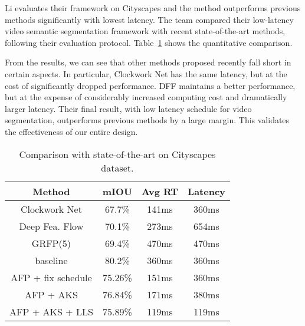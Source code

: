 \documentclass[10pt,twocolumn,letterpaper]{article}
\begin{document}
Li evaluates their framework on Cityscapes \cite{cordts2016cityscapes} and the method outperforms previous methods significantly with lowest latency. The team compared their low-latency video semantic segmentation framework with recent state-of-the-art methods, following their evaluation protocol. Table~\ref{Com} shows the quantitative comparison. 

From the results, we can see that other methods proposed recently fall short in certain aspects. In particular, Clockwork Net \cite{shelhamer2016clockwork} has the same latency, but at the cost of significantly dropped performance. DFF \cite{Zhu2017Deep} maintains a better performance, but at the expense of considerably increased computing cost and dramatically larger latency. Their final result, with low latency schedule for video segmentation, outperforms previous methods by a large margin. This validates the effectiveness of our entire design.

\begin{table}[tp]
	\caption{Comparison with state-of-the-art on Cityscapes dataset.} \label{Com}
	\begin{tabular}{c|c|c|c}
		   \hline
		   Method & mIOU & Avg RT& Latency \\
		   \hline
		   Clockwork Net \cite{shelhamer2016clockwork} & 67.7\% & 141ms& 360ms \\
		   Deep Fea. Flow \cite{Zhu2017Deep} & 70.1\% & 273ms& 654ms \\
		   GRFP(5) \cite{nilsson2016semantic} & 69.4\% & 470ms& 470ms \\
		   \hline
		   baseline & 80.2\% & 360ms& 360ms \\
		   AFP + fix schedule & 75.26\% & 151ms& 360ms \\
		   AFP + AKS & 76.84\% & 171ms& 380ms \\
		   AFP + AKS + LLS & 75.89\% & 119ms& 119ms \\
		   \hline
	\end{tabular}
\end{table}

{\small


}
\end{document}
